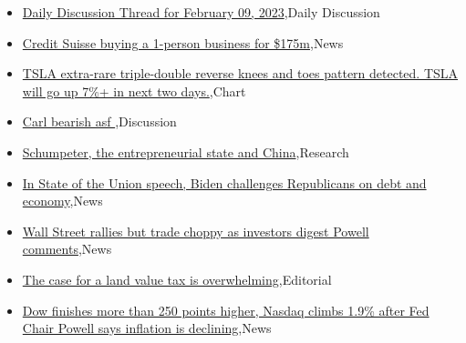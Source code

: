\documentclass{article}%
\begin{document}
%
\begin{itemize}%
\item%
\href{https://reddit.com/r/wallstreetbets/comments/10xs0kq/daily\_discussion\_thread\_for\_february\_09\_2023/}{Daily Discussion Thread for February 09, 2023},Daily Discussion%
\item%
\href{https://reddit.com/r/wallstreetbets/comments/10xpst6/credit\_suisse\_buying\_a\_1person\_business\_for\_175m/}{Credit Suisse buying a 1-person business for \$175m},News%
\item%
\href{https://reddit.com/r/wallstreetbets/comments/10xoivq/tsla\_extrarare\_tripledouble\_reverse\_knees\_and/}{TSLA extra-rare triple-double reverse knees and toes pattern detected. TSLA will go up 7\%+ in next two days.},Chart%
\item%
\href{https://reddit.com/r/wallstreetbets/comments/10xmnbk/carl\_bearish\_asf/}{Carl bearish asf },Discussion%
\item%
\href{https://reddit.com/r/Economics/comments/10x282q/schumpeter\_the\_entrepreneurial\_state\_and\_china/}{Schumpeter, the entrepreneurial state and China},Research%
\item%
\href{https://reddit.com/r/Economics/comments/10wpr34/in\_state\_of\_the\_union\_speech\_biden\_challenges/}{In State of the Union speech, Biden challenges Republicans on debt and economy},News%
\item%
\href{https://reddit.com/r/Economics/comments/10wpjwj/wall\_street\_rallies\_but\_trade\_choppy\_as\_investors/}{Wall Street rallies but trade choppy as investors digest Powell comments},News%
\item%
\href{https://reddit.com/r/Economics/comments/10wg3fa/the\_case\_for\_a\_land\_value\_tax\_is\_overwhelming/}{The case for a land value tax is overwhelming},Editorial%
\item%
\href{https://reddit.com/r/Economics/comments/10wd21h/dow\_finishes\_more\_than\_250\_points\_higher\_nasdaq/}{Dow finishes more than 250 points higher, Nasdaq climbs 1.9\% after Fed Chair Powell says inflation is declining},News%
\end{itemize}%
\end{document}
